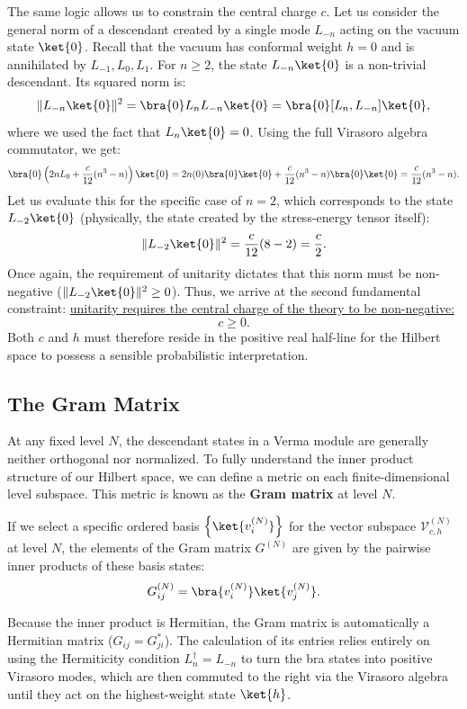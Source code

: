 The same logic allows us to constrain the central charge \(c\). Let us consider the general norm of a descendant created by a single mode \(L_{-n}\) acting on the vacuum state \(\ket{0}\). Recall that the vacuum has conformal weight \(h=0\) and is annihilated by \(L_{-1}, L_0, L_1\). For \(n \ge 2\), the state \(L_{-n}\ket{0}\) is a non-trivial descendant. Its squared norm is:
\[
    \| L_{-n} \ket{0} \|^2 = \bra{0} L_n L_{-n} \ket{0} = \bra{0} [L_n, L_{-n}] \ket{0},
\]
where we used the fact that \(L_n \ket{0} = 0\). Using the full Virasoro algebra commutator, we get:
\[
    \bra{0} \left( 2n L_0 + \frac{c}{12}(n^3 - n) \right) \ket{0} = 2n(0)\bra{0}\ket{0} + \frac{c}{12}(n^3 - n)\bra{0}\ket{0} = \frac{c}{12}(n^3 - n).
\]
Let us evaluate this for the specific case of \(n=2\), which corresponds to the state \(L_{-2}\ket{0}\) (physically, the state created by the stress-energy tensor itself):
\[
    \| L_{-2} \ket{0} \|^2 = \frac{c}{12}(8 - 2) = \frac{c}{2}.
\]
Once again, the requirement of unitarity dictates that this norm must be non-negative (\(\| L_{-2} \ket{0} \|^2 \ge 0\)). Thus, we arrive at the second fundamental constraint: \uline{unitarity requires the central charge of the theory to be non-negative:}
\[
    c \ge 0.
\]
Both \(c\) and \(h\) must therefore reside in the positive real half-line for the Hilbert space to possess a sensible probabilistic interpretation.

\subsection{The Gram Matrix}

At any fixed level \(N\), the descendant states in a Verma module are generally neither orthogonal nor normalized. To fully understand the inner product structure of our Hilbert space, we can define a metric on each finite-dimensional level subspace. This metric is known as the \textbf{Gram matrix} at level \(N\).

If we select a specific ordered basis \(\left\{\ket{v_i^{(N)}}\right\}\) for the vector subspace \(\mathcal{V}_{c,h}^{(N)}\) at level \(N\), the elements of the Gram matrix \(G^{(N)}\) are given by the pairwise inner products of these basis states:
\[
    G_{ij}^{(N)} = \bra{v_i^{(N)}}\ket{v_j^{(N)}}.
\]

Because the inner product is Hermitian, the Gram matrix is automatically a Hermitian matrix (\(G_{ij} = G_{ji}^*\)). The calculation of its entries relies entirely on using the Hermiticity condition \(L_n^\dagger = L_{-n}\) to turn the bra states into positive Virasoro modes, which are then commuted to the right via the Virasoro algebra until they act on the highest-weight state \(\ket{h}\).

